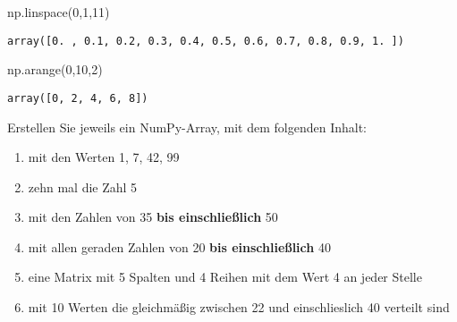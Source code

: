 \documentclass[
  letterpaper,
  DIV=11,
  numbers=noendperiod]{scrreprt}
\newenvironment{Shaded}{\begin{snugshade}}{\end{snugshade}}
\newcommand{\DecValTok}[1]{\textcolor[rgb]{0.68,0.00,0.00}{#1}}
\newcommand{\NormalTok}[1]{\textcolor[rgb]{0.00,0.23,0.31}{#1}}
\providecommand{\tightlist}{%
  \setlength{\itemsep}{0pt}\setlength{\parskip}{0pt}}\usepackage{longtable,booktabs,array}
\begin{document}
\begin{tcolorbox}
\begin{Shaded}
\begin{Highlighting}[]
\NormalTok{np.linspace(}\DecValTok{0}\NormalTok{,}\DecValTok{1}\NormalTok{,}\DecValTok{11}\NormalTok{)}
\end{Highlighting}
\end{Shaded}

\begin{verbatim}
array([0. , 0.1, 0.2, 0.3, 0.4, 0.5, 0.6, 0.7, 0.8, 0.9, 1. ])
\end{verbatim}

\begin{Shaded}
\begin{Highlighting}[]
\NormalTok{np.arange(}\DecValTok{0}\NormalTok{,}\DecValTok{10}\NormalTok{,}\DecValTok{2}\NormalTok{)}
\end{Highlighting}
\end{Shaded}

\begin{verbatim}
array([0, 2, 4, 6, 8])
\end{verbatim}

\begin{tcolorbox}[enhanced jigsaw, breakable, opacityback=0, left=2mm, coltitle=black, leftrule=.75mm, colframe=quarto-callout-tip-color-frame, opacitybacktitle=0.6, toprule=.15mm, bottomtitle=1mm, titlerule=0mm, toptitle=1mm, title=\textcolor{quarto-callout-tip-color}{\faLightbulb}\hspace{0.5em}{Zwischenübung: Array Erstellung}, colbacktitle=quarto-callout-tip-color!10!white, arc=.35mm, bottomrule=.15mm, rightrule=.15mm, colback=white]

Erstellen Sie jeweils ein NumPy-Array, mit dem folgenden Inhalt:

\begin{enumerate}
\def\labelenumi{\arabic{enumi}.}
\tightlist
\item
  mit den Werten 1, 7, 42, 99
\item
  zehn mal die Zahl 5
\item
  mit den Zahlen von 35 \textbf{bis einschließlich} 50
\item
  mit allen geraden Zahlen von 20 \textbf{bis einschließlich} 40
\item
  eine Matrix mit 5 Spalten und 4 Reihen mit dem Wert 4 an jeder Stelle
\item
  mit 10 Werten die gleichmäßig zwischen 22 und einschlieslich 40
  verteilt sind
\end{enumerate}


\end{tcolorbox}
\end{tcolorbox}
\end{document}
